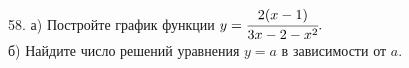 58. а) Постройте график функции $y=\cfrac{2(x-1)}{3x-2-x^2}.$\\
б) Найдите число решений уравнения $y=a$ в зависимости от $a.$\\
